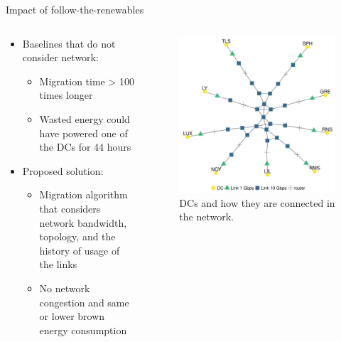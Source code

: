 \documentclass[Ligatures=TeX,table,svgnames,usetotalslideindicator,compress,10pt]{beamer}
\begin{document}
\begin{frame}{Impact of follow-the-renewables  }  

  \begin{columns}    
    \begin{column}{0.6\textwidth}
      \begin{itemize}    
      \item Baselines that do not consider network:
        \begin{itemize}    
        \item Migration time \alert{> 100 times longer} 
        \item Wasted energy could have \alert{powered one of the DCs for 44 hours}
        \end{itemize}    

      \item Proposed solution:
        \begin{itemize}    
        \item Migration algorithm that considers network bandwidth, topology, and the history of usage of the links
        \item No network congestion and same or lower brown energy consumption
        \end{itemize}    
      \end{itemize}
    \end{column}


    \begin{column}{0.4\textwidth}
      \begin{figure}[!h]
        \centering
        \includegraphics[width=\textwidth]{images/topology.png}
        \caption{DCs and how they are connected in the network.}
      \end{figure}
    \end{column}        
  \end{columns}    
\end{frame}
\end{document}
